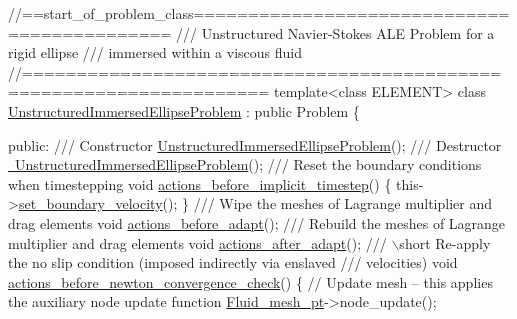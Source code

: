  
\begin{DoxyCodeInclude}
\textcolor{comment}{//==start\_of\_problem\_class============================================}
\textcolor{comment}{/// Unstructured Navier-Stokes ALE Problem for a rigid ellipse }
\textcolor{comment}{}\textcolor{comment}{/// immersed within a viscous fluid}
\textcolor{comment}{}\textcolor{comment}{//====================================================================}
\textcolor{keyword}{template}<\textcolor{keyword}{class} ELEMENT>
\textcolor{keyword}{class }\hyperlink{classUnstructuredImmersedEllipseProblem}{UnstructuredImmersedEllipseProblem} : \textcolor{keyword}{public} Problem
\{

\textcolor{keyword}{public}:
\textcolor{comment}{}
\textcolor{comment}{ /// Constructor}
\textcolor{comment}{} \hyperlink{classUnstructuredImmersedEllipseProblem_a544a35f261200bb4a4e29a88faa1a69c}{UnstructuredImmersedEllipseProblem}();
 \textcolor{comment}{}
\textcolor{comment}{ /// Destructor}
\textcolor{comment}{} \hyperlink{classUnstructuredImmersedEllipseProblem_a84cdf81be59fc646eb4d5b3bc0ff4280}{~UnstructuredImmersedEllipseProblem}();
\textcolor{comment}{}
\textcolor{comment}{ /// Reset the boundary conditions when timestepping}
\textcolor{comment}{} \textcolor{keywordtype}{void} \hyperlink{classUnstructuredImmersedEllipseProblem_a368c412c4c9a9e9403b4e67d3582e3a5}{actions\_before\_implicit\_timestep}()
  \{
   this->\hyperlink{classUnstructuredImmersedEllipseProblem_ab201b187b240105fd8d444d943f6dada}{set\_boundary\_velocity}();
  \}
 \textcolor{comment}{}
\textcolor{comment}{ /// Wipe the meshes of Lagrange multiplier and drag elements}
\textcolor{comment}{} \textcolor{keywordtype}{void} \hyperlink{classUnstructuredImmersedEllipseProblem_aa560217a33a9a9bc150fbdf15dbf1877}{actions\_before\_adapt}();
 \textcolor{comment}{}
\textcolor{comment}{ /// Rebuild the meshes of Lagrange multiplier and drag elements}
\textcolor{comment}{} \textcolor{keywordtype}{void} \hyperlink{classUnstructuredImmersedEllipseProblem_ab1558b409285aea617f4abf7d3a64b3d}{actions\_after\_adapt}();
 \textcolor{comment}{}
\textcolor{comment}{ /// \(\backslash\)short Re-apply the no slip condition (imposed indirectly via enslaved}
\textcolor{comment}{ /// velocities)}
\textcolor{comment}{} \textcolor{keywordtype}{void} \hyperlink{classUnstructuredImmersedEllipseProblem_afa51876a2af9dd7640ff1f5a434804bf}{actions\_before\_newton\_convergence\_check}()
  \{
   \textcolor{comment}{// Update mesh -- this applies the auxiliary node update function}
   \hyperlink{classUnstructuredImmersedEllipseProblem_a0ba79ccde26b781b66d9839460f08bd3}{Fluid\_mesh\_pt}->node\_update();

\end{DoxyCodeInclude}
